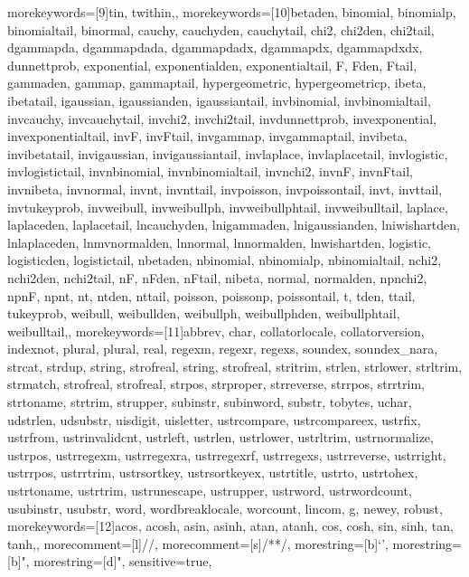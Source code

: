 {    %
    morekeywords=[9]{tin, twithin,},
    morekeywords=[10]{betaden, binomial, binomialp, binomialtail, binormal, cauchy, cauchyden, cauchytail, chi2, chi2den, chi2tail, dgammapda, dgammapdada, dgammapdadx, dgammapdx, dgammapdxdx, dunnettprob, exponential, exponentialden, exponentialtail, F, Fden, Ftail, gammaden, gammap, gammaptail, hypergeometric, hypergeometricp, ibeta, ibetatail, igaussian, igaussianden, igaussiantail, invbinomial, invbinomialtail, invcauchy, invcauchytail, invchi2, invchi2tail, invdunnettprob, invexponential, invexponentialtail, invF, invFtail, invgammap, invgammaptail, invibeta, invibetatail, invigaussian, invigaussiantail, invlaplace, invlaplacetail, invlogistic, invlogistictail, invnbinomial, invnbinomialtail, invnchi2, invnF, invnFtail, invnibeta, invnormal, invnt, invnttail, invpoisson, invpoissontail, invt, invttail, invtukeyprob, invweibull, invweibullph, invweibullphtail, invweibulltail, laplace, laplaceden, laplacetail, lncauchyden, lnigammaden, lnigaussianden, lniwishartden, lnlaplaceden, lnmvnormalden, lnnormal, lnnormalden, lnwishartden, logistic, logisticden, logistictail, nbetaden, nbinomial, nbinomialp, nbinomialtail, nchi2, nchi2den, nchi2tail, nF, nFden, nFtail, nibeta, normal, normalden, npnchi2, npnF, npnt, nt, ntden, nttail, poisson, poissonp, poissontail, t, tden, ttail, tukeyprob, weibull, weibullden, weibullph, weibullphden, weibullphtail, weibulltail,},
    morekeywords=[11]{abbrev, char, collatorlocale, collatorversion, indexnot, plural, plural, real, regexm, regexr, regexs, soundex, soundex_nara, strcat, strdup, string, strofreal, string, strofreal, stritrim, strlen, strlower, strltrim, strmatch, strofreal, strofreal, strpos, strproper, strreverse, strrpos, strrtrim, strtoname, strtrim, strupper, subinstr, subinword, substr, tobytes, uchar, udstrlen, udsubstr, uisdigit, uisletter, ustrcompare, ustrcompareex, ustrfix, ustrfrom, ustrinvalidcnt, ustrleft, ustrlen, ustrlower, ustrltrim, ustrnormalize, ustrpos, ustrregexm, ustrregexra, ustrregexrf, ustrregexs, ustrreverse, ustrright, ustrrpos, ustrrtrim, ustrsortkey, ustrsortkeyex, ustrtitle, ustrto, ustrtohex, ustrtoname, ustrtrim, ustrunescape, ustrupper, ustrword, ustrwordcount, usubinstr, usubstr, word, wordbreaklocale, worcount, lincom, g, newey, robust},
    morekeywords=[12]{acos, acosh, asin, asinh, atan, atanh, cos, cosh, sin, sinh, tan, tanh,},
    morecomment=[l]{//},
    morecomment=[s]{/*}{*/},
    morestring=[b]{`}{'},
    morestring=[b]",
    morestring=[d]",
    sensitive=true,
}

\renewcommand{\lstlistingname}{STATA Code}
\lstset{language = Stata, numbers = none}


\newcommand\reallywidehat[1]{%
\savestack{\tmpbox}{\stretchto{%
  \scaleto{%
    \scalerel*[\widthof{\ensuremath{#1}}]{\kern-.6pt\bigwedge\kern-.6pt}%
    {\rule[-\textheight/2]{1ex}{\textheight}}%
  }{\textheight}%
}{0.5ex}}%
\stackon[1pt]{#1}{\tmpbox}%
}